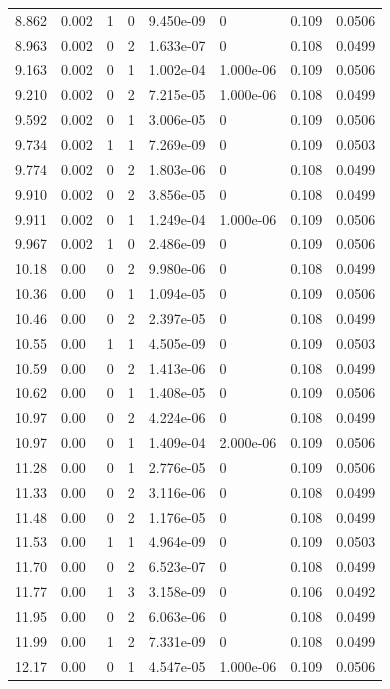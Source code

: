 \documentclass[preview]{standalone}
\begin{document}
{{{\begin{tabular}{L{1.2cm}C{1.2cm} C{0.3cm}C{0.5cm} C{1.4cm}C{1.4cm} C{1.4cm}C{1.4cm}}
  8.862  &  0.002  & 1     &  0 &  9.450e-09  & 0  & 0.109 &  0.0506   \\ 
  8.963  &  0.002  & 0     &  2 &  1.633e-07  & 0  & 0.108 &  0.0499   \\ 
  9.163  &  0.002  & 0     &  1 &  1.002e-04  & 1.000e-06  & 0.109 &  0.0506   \\ 
  9.210  &  0.002  & 0     &  2 &  7.215e-05  & 1.000e-06  & 0.108 &  0.0499   \\ 
  9.592  &  0.002  & 0     &  1 &  3.006e-05  & 0  & 0.109 &  0.0506   \\ 
  9.734  &  0.002  & 1     &  1 &  7.269e-09  & 0  & 0.109 &  0.0503   \\ 
  9.774  &  0.002  & 0     &  2 &  1.803e-06  & 0  & 0.108 &  0.0499   \\ 
  9.910  &  0.002  & 0     &  2 &  3.856e-05  & 0  & 0.108 &  0.0499   \\ 
  9.911  &  0.002  & 0     &  1 &  1.249e-04  & 1.000e-06  & 0.109 &  0.0506   \\ 
  9.967  &  0.002  & 1     &  0 &  2.486e-09  & 0  & 0.109 &  0.0506   \\ 
  10.18  &  0.00  & 0     &  2 &  9.980e-06  & 0  & 0.108 &  0.0499   \\ 
  10.36  &  0.00  & 0     &  1 &  1.094e-05  & 0  & 0.109 &  0.0506   \\ 
  10.46  &  0.00  & 0     &  2 &  2.397e-05  & 0  & 0.108 &  0.0499   \\ 
  10.55  &  0.00  & 1     &  1 &  4.505e-09  & 0  & 0.109 &  0.0503   \\ 
  10.59  &  0.00  & 0     &  2 &  1.413e-06  & 0  & 0.108 &  0.0499   \\ 
  10.62  &  0.00  & 0     &  1 &  1.408e-05  & 0  & 0.109 &  0.0506   \\ 
  10.97  &  0.00  & 0     &  2 &  4.224e-06  & 0  & 0.108 &  0.0499   \\ 
  10.97  &  0.00  & 0     &  1 &  1.409e-04  & 2.000e-06  & 0.109 &  0.0506   \\ 
  11.28  &  0.00  & 0     &  1 &  2.776e-05  & 0  & 0.109 &  0.0506   \\ 
  11.33  &  0.00  & 0     &  2 &  3.116e-06  & 0  & 0.108 &  0.0499   \\ 
  11.48  &  0.00  & 0     &  2 &  1.176e-05  & 0  & 0.108 &  0.0499   \\ 
  11.53  &  0.00  & 1     &  1 &  4.964e-09  & 0  & 0.109 &  0.0503   \\ 
  11.70  &  0.00  & 0     &  2 &  6.523e-07  & 0  & 0.108 &  0.0499   \\ 
  11.77  &  0.00  & 1     &  3 &  3.158e-09  & 0  & 0.106 &  0.0492   \\ 
  11.95  &  0.00  & 0     &  2 &  6.063e-06  & 0  & 0.108 &  0.0499   \\ 
  11.99  &  0.00  & 1     &  2 &  7.331e-09  & 0  & 0.108 &  0.0499   \\ 
  12.17  &  0.00  & 0     &  1 &  4.547e-05  & 1.000e-06  & 0.109 &  0.0506   \\ 
\hline 
\end{tabular} 

}}}
\end{document}
